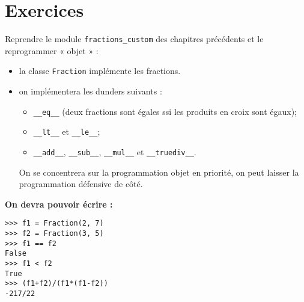 \documentclass[a4paper,10pt,cours,firamath]{nsi}
\begin{document}
\section{Exercices}

\begin{exercice}[ : fractions]
	Reprendre le module \texttt{fractions_custom} des chapitres précédents et le reprogrammer « objet » :
	\begin{itemize}
		\item 	la classe \texttt{Fraction} implémente les fractions.
		\item 	on implémentera les dunders suivants :
		      \begin{itemize}
			      \item 	\texttt{__eq__} (deux fractions sont égales ssi les produits en croix sont égaux);
			      \item 	\texttt{__lt__} et \texttt{__le__};
			      \item 	\texttt{__add__}, \texttt{__sub__}, \texttt{__mul__} et  \texttt{__truediv__}.
		      \end{itemize}
		      On se concentrera sur la programmation objet en priorité, on peut laisser la programmation défensive de côté.
	\end{itemize}
	\textbf{On devra pouvoir écrire :}
	\begin{verbatim}
>>> f1 = Fraction(2, 7)
>>> f2 = Fraction(3, 5)
>>> f1 == f2
False
>>> f1 < f2
True
>>> (f1+f2)/(f1*(f1-f2))
-217/22
\end{verbatim}
	
\end{exercice}
\end{document}
